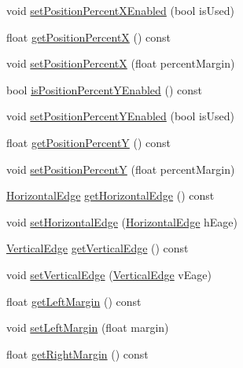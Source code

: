\begin{DoxyCompactItemize}
\item 
void \hyperlink{classui_1_1LayoutComponent_ae6140372921e1fd10034d9b8b90a4d7a}{set\+Position\+Percent\+X\+Enabled} (bool is\+Used)
\item 
float \hyperlink{classui_1_1LayoutComponent_a91fb3991c0d9da922b53f58c8453fcbf}{get\+Position\+PercentX} () const
\item 
void \hyperlink{classui_1_1LayoutComponent_a4461080a849760acbc7f9435e34286b9}{set\+Position\+PercentX} (float percent\+Margin)
\item 
bool \hyperlink{classui_1_1LayoutComponent_afdcda91cca2879a420c406c785c58284}{is\+Position\+Percent\+Y\+Enabled} () const
\item 
void \hyperlink{classui_1_1LayoutComponent_a820438ea0ef37dd3570ef21d9a3392ab}{set\+Position\+Percent\+Y\+Enabled} (bool is\+Used)
\item 
float \hyperlink{classui_1_1LayoutComponent_a3a997e5b6296efbbe01ca923b8dcf7b4}{get\+Position\+PercentY} () const
\item 
void \hyperlink{classui_1_1LayoutComponent_a3bdc6df3202598dd866ec8c2fb1d10e6}{set\+Position\+PercentY} (float percent\+Margin)
\item 
\hyperlink{classui_1_1LayoutComponent_aaa61687a8a4e98f525413e1f0cfacf18}{Horizontal\+Edge} \hyperlink{classui_1_1LayoutComponent_a131733aa3e67cb8dd068cee9b4a6b40d}{get\+Horizontal\+Edge} () const
\item 
void \hyperlink{classui_1_1LayoutComponent_ad3f90ecb148baf2a40773d0d61c7a0fb}{set\+Horizontal\+Edge} (\hyperlink{classui_1_1LayoutComponent_aaa61687a8a4e98f525413e1f0cfacf18}{Horizontal\+Edge} h\+Eage)
\item 
\hyperlink{classui_1_1LayoutComponent_a186978dac32f26bf251942e893999c8f}{Vertical\+Edge} \hyperlink{classui_1_1LayoutComponent_ae45307b95fdd670f3439e3a75369dff9}{get\+Vertical\+Edge} () const
\item 
void \hyperlink{classui_1_1LayoutComponent_a3fa4ab390686d8cab0ee1f3d1ff56e86}{set\+Vertical\+Edge} (\hyperlink{classui_1_1LayoutComponent_a186978dac32f26bf251942e893999c8f}{Vertical\+Edge} v\+Eage)
\item 
float \hyperlink{classui_1_1LayoutComponent_a1d6daf298cc0dc49334d6ecf66ee6fe7}{get\+Left\+Margin} () const
\item 
void \hyperlink{classui_1_1LayoutComponent_a2e26517ace9816d2350b23e1f0bb482d}{set\+Left\+Margin} (float margin)
\item 
float \hyperlink{classui_1_1LayoutComponent_a298c916ad2bba6bb4720574388a9938d}{get\+Right\+Margin} () const

\end{DoxyCompactItemize}
